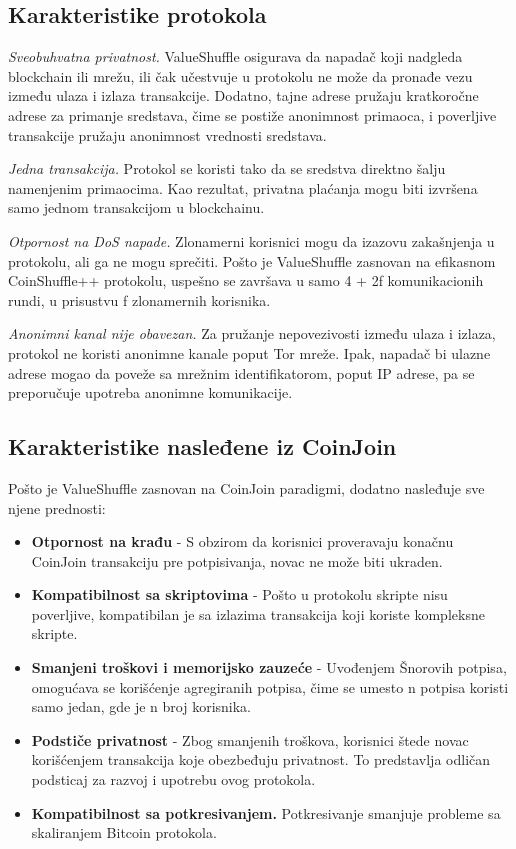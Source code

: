 \documentclass[a4paper]{article}
\begin{document}
\subsection{Karakteristike protokola}
\textit{Sveobuhvatna privatnost.} ValueShuffle osigurava da napadač koji nadgleda blockchain ili mrežu, ili čak učestvuje u protokolu ne može da pronađe vezu između ulaza i izlaza transakcije. Dodatno, tajne adrese pružaju kratkoročne adrese za primanje sredstava, čime se postiže anonimnost primaoca, i poverljive transakcije pružaju anonimnost vrednosti sredstava.

\textit{Jedna transakcija.} Protokol se koristi tako da se sredstva direktno šalju namenjenim primaocima. Kao rezultat, privatna plaćanja mogu biti izvršena samo jednom transakcijom u blockchainu.

\textit{Otpornost na DoS napade.} Zlonamerni korisnici mogu da izazovu zakašnjenja u protokolu, ali ga ne mogu sprečiti. Pošto je ValueShuffle zasnovan na efikasnom CoinShuffle++ protokolu, uspešno se završava u samo 4 + 2f komunikacionih rundi, u prisustvu f zlonamernih korisnika.

\textit{Anonimni kanal nije obavezan.} Za pružanje nepovezivosti između ulaza i izlaza, protokol ne koristi anonimne kanale poput Tor mreže. Ipak, napadač bi ulazne adrese mogao da poveže sa mrežnim identifikatorom, poput IP adrese, pa se preporučuje upotreba anonimne komunikacije.

\subsection{Karakteristike nasleđene iz CoinJoin}
Pošto je ValueShuffle zasnovan na CoinJoin paradigmi, dodatno nasleđuje sve njene prednosti:
\begin{itemize}
	\item \textbf{Otpornost na krađu} - S obzirom da korisnici proveravaju konačnu CoinJoin transakciju pre potpisivanja, novac ne može biti ukraden.
	\item \textbf{Kompatibilnost sa skriptovima} - Pošto u protokolu skripte nisu poverljive, kompatibilan je sa izlazima transakcija koji koriste kompleksne skripte.
	\item \textbf{Smanjeni troškovi i memorijsko zauzeće} - Uvođenjem Šnorovih potpisa, omogućava se korišćenje agregiranih potpisa, čime se umesto n potpisa koristi samo jedan, gde je n broj korisnika.
	\item \textbf{Podstiče privatnost} - Zbog smanjenih troškova, korisnici štede novac korišćenjem transakcija koje obezbeđuju privatnost. To predstavlja odličan podsticaj za razvoj i upotrebu ovog protokola.
	\item \textbf{Kompatibilnost sa potkresivanjem.} Potkresivanje smanjuje probleme sa skaliranjem Bitcoin protokola.
\end{itemize}
\end{document}
